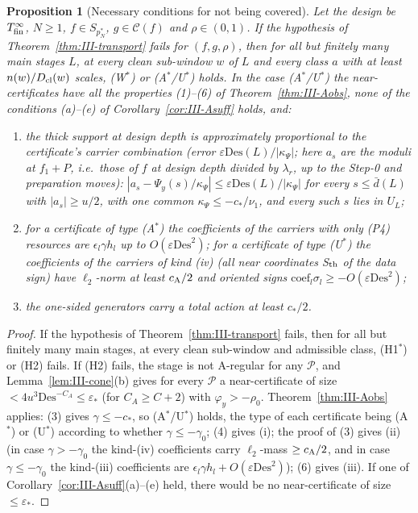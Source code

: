 \documentclass[10pt]{amsart}
\newtheorem{proposition}[theorem]{Proposition}
\theoremstyle{definition}
\theoremstyle{remark}
\newcommand{\Cset}{\mathcal C}
\begin{document}
\begin{proposition}[Necessary conditions for not being covered]
\label{prop:III-residual}
Let the design be $T^\infty_{\rm fin}$, $N\ge1$, $f\in S_{p_N^*}$, $g\in\Cset(f)$
and $\rho\in(0,1)$.  If the hypothesis of
Theorem~\textup{\ref{thm:III-transport}} fails for $(f,g,\rho)$, then for all but
finitely many main stages $L$, at every clean sub-window $w$ of $L$ and every
class $a$ with at least $n(w)/D_{\rm cl}(w)$ scales, \textup{(W$^*$)} or
\textup{(A$^*$/U$^*$)} holds.  In the case \textup{(A$^*$/U$^*$)} the
near-certificates have all the properties
\textup{(1)}--\textup{(6)} of Theorem~\textup{\ref{thm:III-Aobs}}, none of the
conditions \textup{(a)}--\textup{(e)} of Corollary~\textup{\ref{cor:III-Asuff}}
holds, and:
\begin{enumerate}
\item[(i)] the thick support at design depth is approximately proportional
to the certificate's carrier combination (error $\varepsilon\mathrm{Des}(L)/
|\kappa_\Psi|$; here $a_s$ are the moduli at $f_1+P$, i.e.\ those of $f$ at
design depth divided by $\lambda_r$, up to the Step-0 and preparation
moves): $|a_s-\Psi_y(s)/\kappa_\Psi|\le
\varepsilon\mathrm{Des}(L)/|\kappa_\Psi|$ for every $s\le\bar d(L)$ with
$|a_s|\ge u/2$, with one common $\kappa_\Psi\le-c_*/\nu_1$, and every such $s$
lies in $U_L$;
\item[(ii)] for a certificate of type \textup{(A$^*$)} the coefficients of the
carriers with only (P4) resources are $\epsilon_l\gamma h_l$ up to
$O(\varepsilon\mathrm{Des}^2)$; for a certificate of type \textup{(U$^*$)} the
coefficients of the carriers of kind \textup{(iv)}
\textup{(}all near coordinates S$_{\rm th}$ of the data sign\textup{)} have
$\ell_2$-norm at least $c_{\rm A}/2$ and oriented signs $\mathrm{coef}_l\sigma_l\ge
-O(\varepsilon\mathrm{Des}^2)$;
\item[(iii)] the one-sided generators carry a total action at least $c_*/2$.
\end{enumerate}
\end{proposition}

\begin{proof}
If the hypothesis of Theorem~\ref{thm:III-transport} fails, then for all but
finitely many main stages, at every clean sub-window and admissible class,
(H1$^*$) or (H2) fails.  If (H2) fails, the stage is not A-regular for any
$\mathcal P$, and Lemma~\ref{lem:III-cone}(b) gives for every $\mathcal P$ a
near-certificate of size $<4u^3\mathrm{Des}^{-C_A}\le\varepsilon_*$ (for
$C_A\ge C+2$) with $\varphi_y>-\rho_0$.  Theorem~\ref{thm:III-Aobs} applies:
(3) gives $\gamma\le-c_*$, so (A$^*$/U$^*$) holds, the type of each
certificate being (A$^*$) or (U$^*$) according to whether $\gamma\le-\gamma_0$; (4) gives (i); the proof of (3) gives (ii) (in case
$\gamma>-\gamma_0$ the kind-(iv) coefficients carry $\ell_2$-mass $\ge c_{\rm A}/2$, and
in case $\gamma\le-\gamma_0$ the kind-(iii) coefficients are $\epsilon_l\gamma
h_l+O(\varepsilon\mathrm{Des}^2)$); (6) gives (iii).  If one of
Corollary~\ref{cor:III-Asuff}(a)--(e) held, there would be no near-certificate of
size $\le\varepsilon_*$.
\end{proof}
\end{document}
